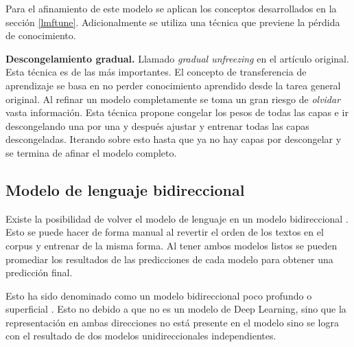 Para el afinamiento de este modelo se aplican los conceptos desarrollados en la sección \ref{lmftune}. Adicionalmente se utiliza una técnica que previene la pérdida de conocimiento.

\textbf{Descongelamiento gradual.} Llamado \emph{gradual unfreezing} en el artículo original. Esta técnica es de las más importantes. El concepto de transferencia de aprendizaje se basa en no perder conocimiento aprendido desde la tarea general original. Al refinar un modelo completamente se toma un gran riesgo de \emph{olvidar} vasta información. Esta técnica propone congelar los pesos de todas las capas e ir descongelando una por una y después ajustar y entrenar todas las capas descongeladas. Iterando sobre esto hasta que ya no hay capas por descongelar y se termina de afinar el modelo completo.

\subsection{Modelo de lenguaje bidireccional}

Existe la posibilidad de volver el modelo de lenguaje en un modelo bidireccional \parencite{howard2018}. Esto se puede hacer de forma manual al revertir el orden de los textos en el corpus y entrenar de la misma forma. Al tener ambos modelos listos se pueden promediar los resultados de las predicciones de cada modelo para obtener una predicción final.

Esto ha sido denominado como un modelo bidireccional poco profundo o superficial \parencite{devlin2018bert}. Esto no debido a que no es un modelo de Deep Learning, sino que la representación en ambas direcciones no está presente en el modelo sino se logra con el resultado de dos modelos unidireccionales independientes.
